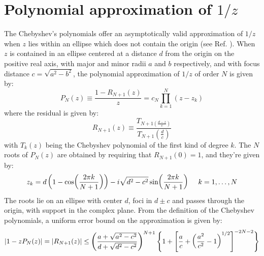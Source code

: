 \chapter{Polynomial approximation of $1/z$}
\label{app:approx}
The Chebyshev's polynomials offer an asymptotically valid approximation of $1/z$ when $z$ lies within an ellipse which does not contain the origin (see Ref. \cite{Manteuffel1977, doi:10.1137/1.9780898718003}).
When $z$ is contained in an ellipse centered at a distance $d$ from the origin on the positive real axis, with major and minor radii $a$ and $b$ respectively, and with focus distance $c = \sqrt{a^2 - b^2}$, the polynomial approximation of $1/z$ of order $N$ is given by:
\begin{equation}
    P_N (z) \equiv \frac{1 - R_{N+1}(z)}{z} = c_N \prod_{k = 1}^N (z - z_k)
\end{equation}
where the residual is given by:
\begin{equation}\label{remainder}
    R_{N+1}(z) \equiv \frac{T_{N+1(\frac{d-z}{c})}}{T_{N+1}(\frac{d}{c})}
\end{equation}
with $T_k(z)$ being the Chebyshev polynomial of the first kind of degree $k$. The $N$ roots of $P_N(z)$ are obtained by requiring that $R_{N+1}(0) = 1$, and they're given by:
\begin{equation}\label{roots}
    z_k = d\left(1 - \cos(\frac{2\pi k}{N+1}) \right) - i \sqrt{d^2 - c^2} \sin(\frac{2\pi k}{N+1}) \hspace{5mm} k = 1, \dots, N
\end{equation}
The roots lie on an ellipse with center $d$, foci in $d \pm c$ and passes through the origin, with support in the complex plane.
From the definition of the Chebyshev polynomials, a uniform error bound on the approximation is given by:
\begin{equation}
    \abs{1 - zP_N(z)} = \abs{R_{N+1}(z)} \leq \left( \frac{a + \sqrt{a^2 - c^2}}{d + \sqrt{d^2 - c^2}} \right)^{N+1} \Biggl\{ 1 + \left[ \frac{a}{c} + \left( \frac{a^2}{c^2} - 1 \right)^{1/2} \right]^{-2N - 2} \Biggr\}
\end{equation}

